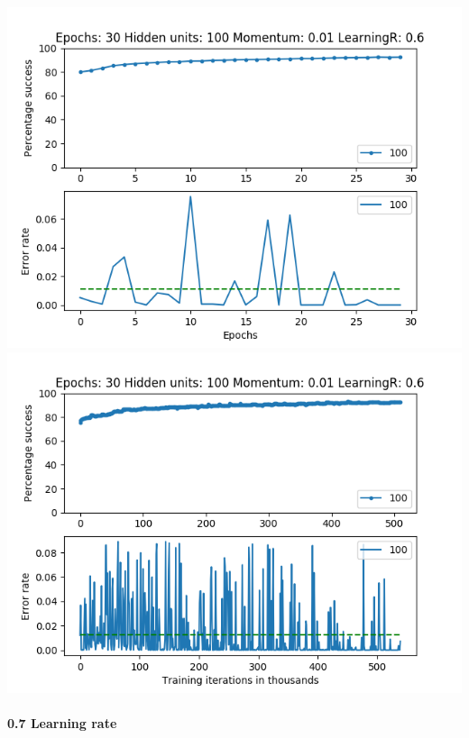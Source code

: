 \documentclass[11pt]{article}
\makeatletter
\def\maxwidth{\ifdim\Gin@nat@width>\linewidth\linewidth
    \else\Gin@nat@width\fi}
\let\Oldincludegraphics\includegraphics
\renewcommand{\includegraphics}[1]{\Oldincludegraphics[width=.8\maxwidth]{#1}}
\makeatother
\begin{document}
\includegraphics{Experiment2/E2_NN_Epoch_Momentum_0.01_30Epochs_100_LR_0.6_Hiddenunits.png}
\includegraphics{Experiment2/E2_NN_Training_Momentum_0.01_30Epochs_100_LR_0.6_Hiddenunits.png}

\hypertarget{learning-rate-7}{%
\paragraph{0.7 Learning rate}\label{learning-rate-7}}
\end{document}
